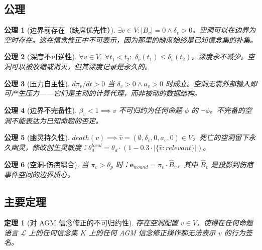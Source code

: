 \documentclass[11pt]{article}
\newtheorem{theorem}{定理}[section]
\newtheorem{axiom}{公理}[section]
\begin{document}
\subsection{公理}

\begin{axiom}[边界前存在（缺席优先性）]
\label{ax:void-primacy}
$\exists v \in V: |B_v| = 0 \wedge \delta_v > 0$。空洞可以在边界为空时存在。这在信念修正中不可表示，因为那里的缺席始终是已知信念集的补集。
\end{axiom}

\begin{axiom}[深度不可逆性]
\label{ax:void-depth}
$\forall v \in V,\; \forall t_1 < t_2:\; \delta_v(t_1) \leq \delta_v(t_2)$。深度永不减少。空洞可以被收缩或消灭，但其深度记录是永久的。
\end{axiom}

\begin{axiom}[压力自主性]
\label{ax:void-pressure}
$d\pi_v/dt > 0$ 当 $\delta_v > 0 \wedge a_v > 0$ 时成立。空洞无需外部输入即可产生压力——它们是主动的计算代理，而非被动的数据结构。
\end{axiom}

\begin{axiom}[边界不完备性]
\label{ax:void-incomplete}
$\beta_v < 1 \implies v$ 不可归约为任何命题 $\phi$ 的 $\neg\phi$。不完备的空洞不能表达为已知命题的否定。
\end{axiom}

\begin{axiom}[幽灵持久性]
\label{ax:void-ghost}
$death(v) \implies \hat{v} = (\emptyset, \delta_v, 0, a_v, 0) \in V$。死亡的空洞留下永久幽灵，修改创生灵敏度：$\theta_d^{local} = \theta_d \cdot (1 - 0.3 \cdot |\{\hat{v}: relevant\}|)$。
\end{axiom}

\begin{axiom}[空洞-伤疤耦合]
\label{ax:void-coupling}
当 $\pi_v > \theta_p$ 时：$\mathbf{e}_{wound} = \pi_v \cdot \hat{B}_v$，其中 $\hat{B}_v$ 是投影到伤疤事件空间的边界质心。
\end{axiom}

\subsection{主要定理}

\begin{theorem}[对 AGM 信念修正的不可归约性]
\label{thm:void-agm}
存在空洞配置 $v \in V$，使得在任何命题语言 $\mathcal{L}$ 上的任何信念集 $K$ 上的任何 AGM 信念修正操作都无法表示 $v$ 的行为签名。
\end{theorem}
\end{document}
